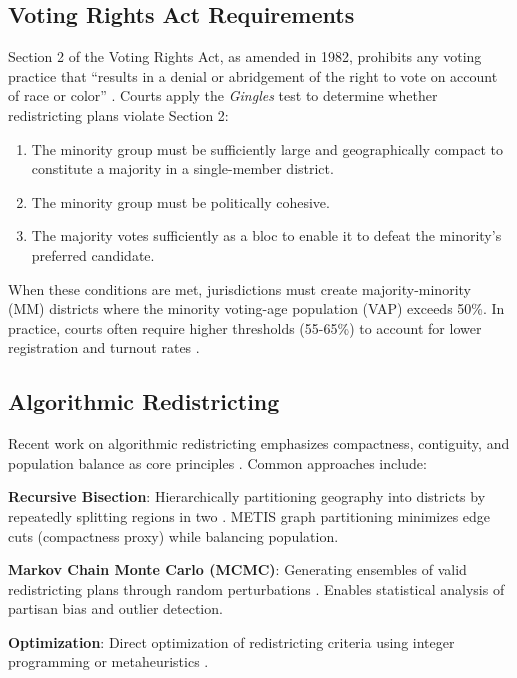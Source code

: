 \subsection{Voting Rights Act Requirements}

Section 2 of the Voting Rights Act, as amended in 1982, prohibits any voting practice that ``results in a denial or abridgement of the right to vote on account of race or color'' \citep{vra1982}. Courts apply the \emph{Gingles} test \citep{thornburg1986} to determine whether redistricting plans violate Section 2:

\begin{enumerate}
\item The minority group must be sufficiently large and geographically compact to constitute a majority in a single-member district.
\item The minority group must be politically cohesive.
\item The majority votes sufficiently as a bloc to enable it to defeat the minority's preferred candidate.
\end{enumerate}

When these conditions are met, jurisdictions must create majority-minority (MM) districts where the minority voting-age population (VAP) exceeds 50\%. In practice, courts often require higher thresholds (55-65\%) to account for lower registration and turnout rates \citep{katz2020}.

\subsection{Algorithmic Redistricting}

Recent work on algorithmic redistricting emphasizes compactness, contiguity, and population balance as core principles \citep{duchin2018, fifield2020, deford2021}. Common approaches include:

\textbf{Recursive Bisection}: Hierarchically partitioning geography into districts by repeatedly splitting regions in two \citep{barnes1982, karypis1998}. METIS graph partitioning \citep{karypis1998metis} minimizes edge cuts (compactness proxy) while balancing population.

\textbf{Markov Chain Monte Carlo (MCMC)}: Generating ensembles of valid redistricting plans through random perturbations \citep{duchin2018, deford2021}. Enables statistical analysis of partisan bias and outlier detection.

\textbf{Optimization}: Direct optimization of redistricting criteria using integer programming \citep{hess1965, shirabe2005} or metaheuristics \citep{bacao2005}.

